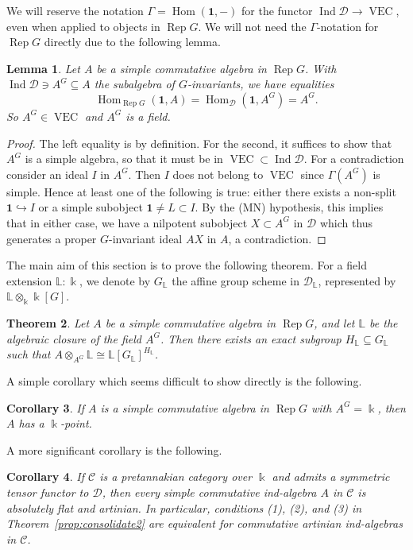 \documentclass[11pt]{amsart}
\def\Ind{\operatorname{Ind}}
\def\Hom{\operatorname{Hom}}
\def\Cs{\mathscr{C}}
\def\Ds{\mathscr{D}}
\def\bk{\Bbbk}
\def\Rep{\operatorname{Rep}}
\def\VEC{\operatorname{VEC}}
\def\sub{\subseteq}
\newtheorem{thm}{Theorem}[section]
\newtheorem{cor}[thm]{Corollary}
\newtheorem{lemma}[thm]{Lemma}
\theoremstyle{definition}
\theoremstyle{remark}
\numberwithin{equation}{section}
\newcommand{\unit}{\mathbf{1}}
\begin{document}
We will reserve the notation $\Gamma=\Hom(\unit,-)$ for the functor $\Ind\Ds\to\VEC$, even when applied to objects in $\Rep G$. We will not need the $\Gamma$-notation for $\Rep G$ directly due to the following lemma.
\begin{lemma}\label{lem:AG} Let $A$ be a simple commutative algebra in $\Rep G$.
With $\Ind\Ds\ni A^G\sub A$ the subalgebra of $G$-invariants,  we have equalities
    \[\Hom_{\Rep G}(\unit,A)=\Hom_{\Ds}(\unit,A^G)= A^G.\]
    So $A^G\in\VEC$ and $A^G$ is a field.
\end{lemma}
\begin{proof} The left equality is by definition.
    For the second, it suffices to show that $A^G$ is a simple algebra, so that it must be in $\VEC\subset\Ind\Ds$. For a contradiction consider an ideal $I$ in $A^G$. Then $I$ does not belong to $\VEC$ since $\Gamma(A^G)$ is simple. Hence at least one of the following is true: either there exists a non-split $\unit\hookrightarrow I$ or a simple subobject $\unit\not=L\subset I$. By the (MN) hypothesis, this implies that in either case, we have a nilpotent subobject $X\subset A^G$ in $\Ds$ which thus generates a proper $G$-invariant ideal $AX$ in $A$, a contradiction.
\end{proof}



The main aim of this section is to prove the following theorem. For a field extension $\mathbb{L}:\bk$, we denote by $G_{\mathbb{L}}$ the affine group scheme in $\Ds_\mathbb{L}$, represented by $\mathbb{L}\otimes_{\bk}\bk[G]$.

\begin{thm}\label{thm simple comm alg}
    Let $A$ be a simple commutative algebra in $\Rep G$, and let $\mathbb{L}$ be the algebraic closure of the field $A^G$.   Then there exists an exact subgroup $H_{\mathbb{L}}\sub G_{\mathbb{L}}$ such that $A\otimes_{A^G}\mathbb{L}\cong \mathbb{L}[G_{\mathbb{L}}]^{H_{\mathbb{L}}}$. 
\end{thm}

A simple corollary which seems difficult to show directly is the following.

\begin{cor}\label{cor:kpoint}
    If $A$ is a simple commutative algebra in $\Rep G$ with  $A^G=\Bbbk$, then $A$ has a $\Bbbk$-point.
\end{cor}

A more significant corollary is the following. 
\begin{cor}\label{cor pretann simple comm alg}
If $\Cs$ is a pretannakian category over $\bk$ and admits a symmetric tensor functor to $\Ds$, then every simple commutative ind-algebra $A$ in $\Cs$ is absolutely flat and artinian.  In particular, conditions (1), (2), and (3) in Theorem~\ref{prop:consolidate2} are equivalent for commutative artinian ind-algebras in $\Cs$.
\end{cor}
\end{document}
